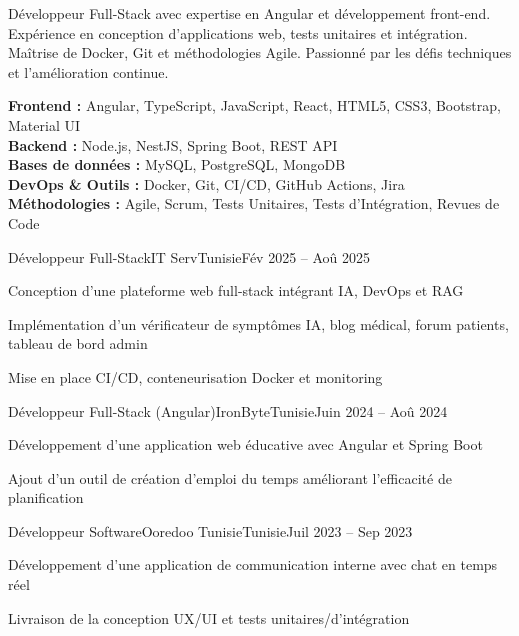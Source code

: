 \documentclass[11pt,a4paper]{article}
\begin{document}
\makecvheader
\makecontactinfo

Développeur Full-Stack avec expertise en Angular et développement front-end. Expérience en conception d'applications web, tests unitaires et intégration. Maîtrise de Docker, Git et méthodologies Agile. Passionné par les défis techniques et l'amélioration continue.

{\small
\textbf{Frontend :} Angular, TypeScript, JavaScript, React, HTML5, CSS3, Bootstrap, Material UI\\[1.5pt]
\textbf{Backend :} Node.js, NestJS, Spring Boot, REST API\\[1.5pt]
\textbf{Bases de données :} MySQL, PostgreSQL, MongoDB\\[1.5pt]
\textbf{DevOps \& Outils :} Docker, Git, CI/CD, GitHub Actions, Jira\\[1.5pt]
\textbf{Méthodologies :} Agile, Scrum, Tests Unitaires, Tests d'Intégration, Revues de Code
}


\begin{internship}{Développeur Full-Stack}{IT Serv}{Tunisie}{Fév 2025 -- Aoû 2025}{}
  \item Conception d'une plateforme web full-stack intégrant IA, DevOps et RAG
  \item Implémentation d'un vérificateur de symptômes IA, blog médical, forum patients, tableau de bord admin
  \item Mise en place CI/CD, conteneurisation Docker et monitoring
\end{internship}

\begin{internship}{Développeur Full-Stack (Angular)}{IronByte}{Tunisie}{Juin 2024 -- Aoû 2024}{}
  \item Développement d'une application web éducative avec Angular et Spring Boot
  \item Ajout d'un outil de création d'emploi du temps améliorant l'efficacité de planification
\end{internship}

\begin{internship}{Développeur Software}{Ooredoo Tunisie}{Tunisie}{Juil 2023 -- Sep 2023}{}
  \item Développement d'une application de communication interne avec chat en temps réel
  \item Livraison de la conception UX/UI et tests unitaires/d'intégration
\end{internship}
\end{document}
